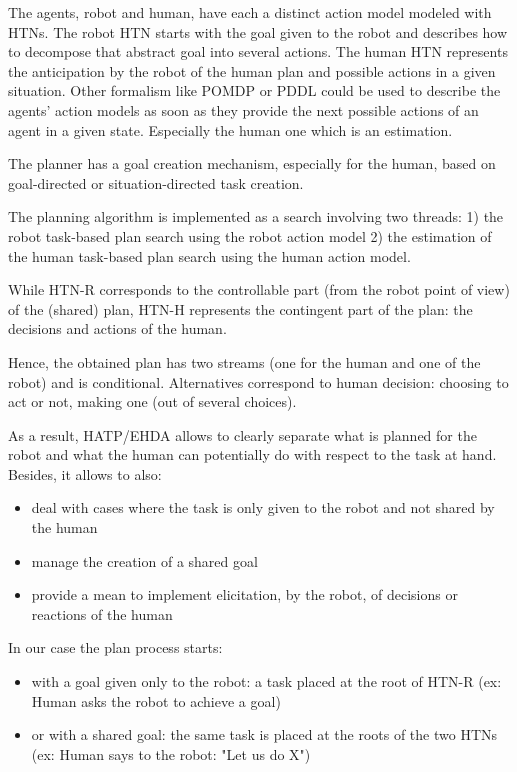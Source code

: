 \documentclass[letterpaper]{article} %
\begin{document}
The agents, robot and human, have each a distinct action model modeled with HTNs. The robot HTN starts with the goal given to the robot and describes how to decompose that abstract goal into several actions. The human HTN represents the anticipation by the robot of the human plan and possible actions in a given situation. Other formalism like POMDP or PDDL could be used to describe the agents' action models as soon as they provide the next possible actions of an agent in a given state. Especially the human one which is an estimation.

The planner has a goal creation mechanism, especially for the human, based on goal-directed or situation-directed task creation.

The planning algorithm is implemented as a search involving two threads: 1) the robot task-based plan search using the robot action model 2) the estimation of the human task-based plan search using the human action model.

While HTN-R corresponds to the controllable part  (from the robot point of view) of the (shared) plan, HTN-H represents the contingent part of the plan: the decisions and actions of the human. 

Hence, the obtained plan has two streams (one for the human and one of the robot) and is conditional. Alternatives correspond to human decision: choosing to act or not, making one (out of several choices).

As a result, HATP/EHDA allows to clearly separate what is planned for the robot and what the human can potentially do with respect to the task at hand. Besides, it allows to also:
\begin{itemize}
    \item deal with cases where the task is only given to the robot and not shared by the human
    \item manage the creation of a shared goal
    \item provide a mean to implement elicitation, by the robot, of decisions or reactions of the human
\end{itemize}
In our case the plan process starts:
\begin{itemize}
   \item with a goal given only to the robot: a task placed at the root of HTN-R (ex: Human asks the robot to achieve a goal)
   \item or with a shared goal: the same task is placed at the roots of  the two HTNs (ex: Human says to the robot: "Let us do X")
\end{itemize}
\end{document}

